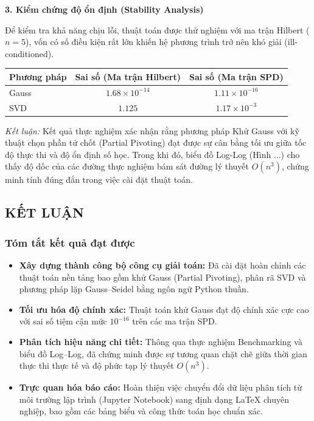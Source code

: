 \documentclass[12pt]{article}
\begin{document}
\textbf{3. Kiểm chứng độ ổn định (Stability Analysis)}

Để kiểm tra khả năng chịu lỗi, thuật toán được thử nghiệm với ma trận Hilbert ($n=5$), vốn có số điều kiện rất lớn khiến hệ phương trình trở nên khó giải (ill-conditioned).

\begin{center}
\begin{tabular}{|l|c|c|}
\hline
\textbf{Phương pháp} & \textbf{Sai số (Ma trận Hilbert)} & \textbf{Sai số (Ma trận SPD)} \\ \hline
Gauss & $1.68 \times 10^{-14}$ & $1.11 \times 10^{-16}$ \\ \hline
SVD & $1.125$ & $1.17 \times 10^{-3}$ \\ \hline
\end{tabular}
\end{center}

\textit{Kết luận:} Kết quả thực nghiệm xác nhận rằng phương pháp Khử Gauss với kỹ thuật chọn phần tử chốt (Partial Pivoting) đạt được sự cân bằng tối ưu giữa tốc độ thực thi và độ ổn định số học. Trong khi đó, biểu đồ Log-Log (Hình ...) cho thấy độ dốc của các đường thực nghiệm bám sát đường lý thuyết $O(n^3)$, chứng minh tính đúng đắn trong việc cài đặt thuật toán.

\subsection{KẾT LUẬN}

\subsubsection{Tóm tắt kết quả đạt được}
\begin{itemize}
    \item \textbf{Xây dựng thành công bộ công cụ giải toán:} Đã cài đặt hoàn chỉnh các thuật toán nền tảng bao gồm khử Gauss (Partial Pivoting), phân rã SVD và phương pháp lặp Gauss--Seidel bằng ngôn ngữ Python thuần.
    \item \textbf{Tối ưu hóa độ chính xác:} Thuật toán khử Gauss đạt độ chính xác cực cao với sai số tiệm cận mức $10^{-16}$ trên các ma trận SPD.
    \item \textbf{Phân tích hiệu năng chi tiết:} Thông qua thực nghiệm Benchmarking và biểu đồ Log--Log, đã chứng minh được sự tương quan chặt chẽ giữa thời gian thực thi thực tế và độ phức tạp lý thuyết $O(n^3)$.
    \item \textbf{Trực quan hóa báo cáo:} Hoàn thiện việc chuyển đổi dữ liệu phân tích từ môi trường lập trình (Jupyter Notebook) sang định dạng \LaTeX{} chuyên nghiệp, bao gồm các bảng biểu và công thức toán học chuẩn xác.
\end{itemize}
\end{document}
